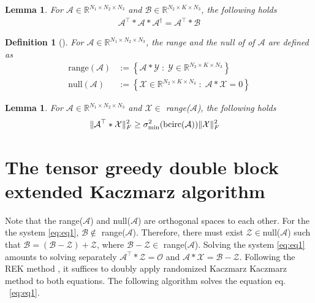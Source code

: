 \documentclass[11pt]{article}
\newtheorem{definition}[theorem]{Definition}
\newtheorem{lemma}[theorem]{Lemma}
\def\fm#1{\mathcal{#1}}
\def\r{\mathbb{R}}
\begin{document}
\begin{lemma}\label{lem:lem-10}
For $\fm A\in \r^{N_1\times N_2\times N_3}$ and  $\fm B\in \r^{N_2\times K\times N_3}$, the following holds
\begin{align}
\fm A^\top * \fm A * \fm A^\dagger = \fm A^\top * \fm B
\end{align}
\end{lemma}
\begin{definition}[\cite{an2024randomized}] For $\fm A\in \r^{N_1\times N_2\times N_3}$, the range  and the null of of $\fm A$ are defined as 
\begin{align*}
    \text{range}(\fm A ) &:= \left\{\fm A * \fm Y\; :\; \fm Y\in \r^{N_2\times K\times N_3} \right\}\\
    \text{null}(\fm A) &:= \left\{ \fm X \in \r^{N_2\times K \times N_3 }\;:\; \fm A * \fm X = 0    \right\}
\end{align*}
\end{definition}

\begin{lemma}\label{lem:lem-12}
For $\fm A\in \r^{N_1\times N_2\times N_3}$ and $\fm X\in $ range($\fm A$),  the following holds 
\begin{align}
    \Vert \fm A^\top * \fm X \Vert_F^2 &  \geq \sigma_{\min}^2(\bcirc(\fm A))\Vert \fm X \Vert_F^2
\end{align}
\end{lemma}

\section{The tensor greedy double block extended Kaczmarz algorithm}\label{sec:tdgbek}

Note that the range($\fm A $) and null($\fm A$) are orthogonal spaces to each other. For the the system  \eqref{eq:eq1}, $\fm B \notin$ range($\fm A $). Therefore, there must exist $\fm Z \in $null($\fm A$) such that $\fm B= (\fm B - \fm Z )  + \fm Z $, where $\fm B- \fm Z \in $ range($\fm A$). Solving the system \eqref{eq:eq1}  amounts to solving separately $\fm A^\top * \fm Z = \fm O$ and $\fm A* \fm X = \fm B - \fm Z$. Following the REK method \cite{zouzias2013rando}, it suffices to doubly apply randomized Kaczmarz Kaczmarz method to both equations. The following algorithm solves the equation eq. ~\eqref{eq:eq1}.
\end{document}
